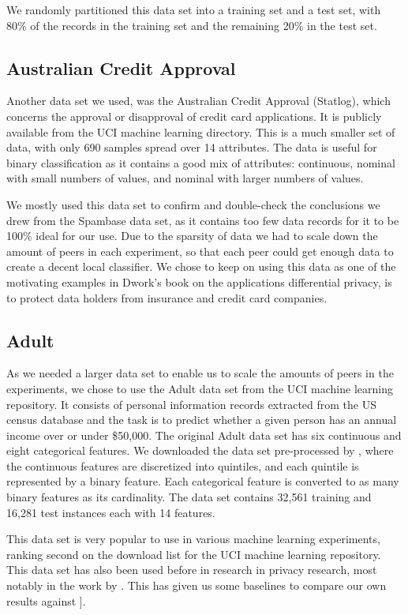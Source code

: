 We randomly partitioned this data set into a training set and a test set, with 80\% of the records in the training set and the remaining 20\% in the test set.

\subsection{Australian Credit Approval}
Another data set we used, was the Australian Credit Approval (Statlog)\citep{australian1987data}, which concerns the approval or disapproval of credit card applications. It is publicly available from the UCI machine learning directory. This is a much smaller set of data, with only 690 samples spread over 14 attributes. The data is useful for binary classification as it contains a good mix of attributes: continuous, nominal with small numbers of values, and nominal with larger numbers of values.

We mostly used this data set to confirm and double-check the conclusions we drew from the Spambase data set, as it contains too few data records for it to be 100\% ideal for our use. Due to the sparsity of data we had to scale down the amount of peers in each experiment, so that each peer could get enough data to create a decent local classifier. We chose to keep on using this data as one of the motivating examples in Dwork's book\citep{dwork2013algorithmic} on the applications differential privacy, is to protect data holders from insurance and credit card companies. 


\subsection{Adult}
As we needed a larger data set to enable us to scale the amounts of peers in the experiments, we chose to use the Adult data set from the UCI machine learning repository.  It consists of personal information records extracted from the US census database and the task is to predict whether a given person has an annual income over or under \$50,000. The original Adult data set has six continuous and eight categorical features. We
downloaded the data set pre-processed by \cite{platt1999fast}, where the continuous features are discretized into quintiles, and each quintile is represented by a binary feature. Each categorical feature is converted to as many binary features as its cardinality. The data set contains 32,561 training and 16,281 test instances each with 14 features.

This data set is very popular to use in various machine learning experiments, ranking second on the download list for the UCI machine learning repository. This data set has also been used before in research in privacy research, most notably in the work by \cite{pathak2010diffprivhomo}. This has given us some baselines to compare our own results against ].

